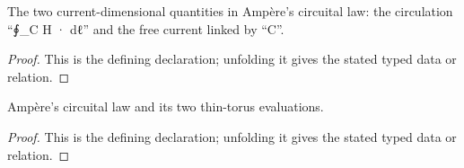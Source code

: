 \begin{definition}[ToroidalAmpereReadouts]
  \label{decl:physics:IPhO_2026_3_A_1:ToroidalAmpereReadouts}
  The two current-dimensional quantities in Ampère's circuital law: the circulation “∮\_C H · dℓ” and the free current linked by “C”.
\end{definition}
\begin{proof}
  This is the defining declaration; unfolding it gives the stated typed data or relation.
\end{proof}

\begin{definition}[SatisfiesToroidalAmpereCircuitalLaw]
  \label{decl:physics:IPhO_2026_3_A_1:SatisfiesToroidalAmpereCircuitalLaw}
  Ampère's circuital law and its two thin-torus evaluations.
\end{definition}
\begin{proof}
  This is the defining declaration; unfolding it gives the stated typed data or relation.
\end{proof}

